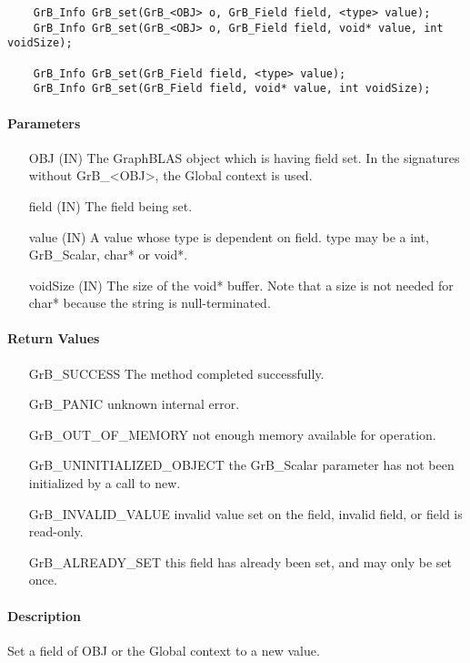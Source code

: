 \begin{verbatim}
    GrB_Info GrB_set(GrB_<OBJ> o, GrB_Field field, <type> value);
    GrB_Info GrB_set(GrB_<OBJ> o, GrB_Field field, void* value, int voidSize);

    GrB_Info GrB_set(GrB_Field field, <type> value);
    GrB_Info GrB_set(GrB_Field field, void* value, int voidSize);
\end{verbatim}

\paragraph{Parameters}

\begin{itemize}[leftmargin=2.1in]
    \item[{\sf OBJ}] ({\sf IN}) The GraphBLAS object which is having {\sf field} set.
                                In the signatures without {\sf GrB\_<OBJ>}, the Global context is used.
    \item[{\sf field}] ({\sf IN}) The field being set.
    \item[{\sf value}] ({\sf IN}) A value whose type is dependent on {\sf field}.
                                {\sf type} may be a {\sf int}, {\sf GrB\_Scalar}, {\sf char*} or {\sf void*}.
    \item[{\sf voidSize}] ({\sf IN}) The size of the {\sf void*} buffer. Note that a size is not needed for
                                {\sf char*} because the string is null-terminated.
\end{itemize}

\paragraph{Return Values}

\begin{itemize}[leftmargin=2.1in]
    \item[{\sf GrB\_SUCCESS}]  The method completed successfully.
    \item[{\sf GrB\_PANIC}]             unknown internal error.
    \item[{\sf GrB\_OUT\_OF\_MEMORY}]          not enough memory available for operation.
    \item[{\sf GrB\_UNINITIALIZED\_OBJECT}]          the {\sf GrB\_Scalar} parameter has not been
                                        initialized by a call to {\sf new}.
    \item[{\sf GrB\_INVALID\_VALUE}]    invalid value set on the field, invalid field, or field is read-only.
    \item[{\sf GrB\_ALREADY\_SET}]  this field has already been set, and may only be set once. 
    \end{itemize}

\paragraph{Description}

Set a field of {\sf OBJ} or the Global context to a new value.